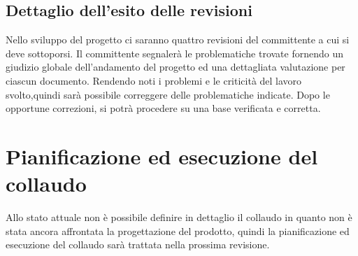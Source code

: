 \documentclass[12pt,a4paper]{article}
\begin{document}
\subsection{Dettaglio dell'esito delle revisioni}
Nello sviluppo del progetto ci saranno quattro revisioni del committente a cui si deve sottoporsi. Il committente segnalerà le problematiche trovate fornendo un giudizio globale dell'andamento del progetto ed una dettagliata valutazione per ciascun documento. Rendendo noti i problemi e le criticità del lavoro svolto,quindi sarà possibile correggere delle problematiche indicate. Dopo le opportune correzioni, si potrà procedere su una base verificata e corretta.
\newpage
\section{Pianificazione ed esecuzione del collaudo}
Allo stato attuale non è possibile definire in dettaglio il collaudo in quanto non è stata ancora affrontata la
progettazione del prodotto, quindi la pianificazione ed esecuzione del collaudo sarà trattata nella prossima revisione.
\end{document}
